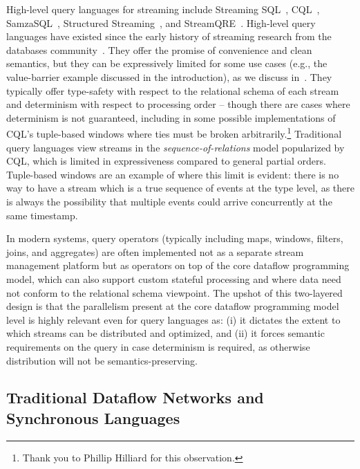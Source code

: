 High-level query languages for streaming include Streaming SQL~\cite{jain2008towards,begoli2019one}, CQL~\cite{arasu2003cql,ABW2006CQL}, SamzaSQL~\cite{pathirage2016samzasql}, Structured Streaming~\cite{armbrust2018structured},
and StreamQRE~\cite{StreamQRE}.
High-level query languages have existed since the early history
of streaming research from the databases community~\cite{stonebraker20058}.
They offer the promise of convenience and clean semantics, but they can be expressively limited for some use cases (e.g., the value-barrier example discussed in the introduction), as we discuss in~.
They typically offer type-safety with respect to the relational schema of each stream and determinism with respect to processing order --
though there are cases where determinism is not guaranteed, including in some possible implementations of CQL's tuple-based windows where ties must be broken arbitrarily.\footnote{Thank you to Phillip Hilliard for this observation.}
Traditional query languages view streams in the \emph{sequence-of-relations} model popularized by CQL, which is limited in expressiveness compared to general partial orders.
Tuple-based windows are an example of where this limit is evident: there is no way to have a stream which is a true sequence of events at the type level, as there is always the possibility that multiple events could arrive concurrently at the same timestamp.

In modern systems, query operators (typically including maps, windows, filters, joins, and aggregates)
are often implemented not as a separate stream management platform but as
operators on top of the core dataflow programming model, which can also support custom stateful processing and where data need not conform to the relational schema viewpoint.
The upshot of this two-layered design is that the parallelism present at the core dataflow programming model level is highly relevant even for query languages as: (i) it dictates the extent to which streams can be distributed and optimized, and (ii) it forces semantic requirements on the query in case determinism is required, as otherwise distribution will not be semantics-preserving.

\subsection{Traditional Dataflow Networks and Synchronous Languages}

